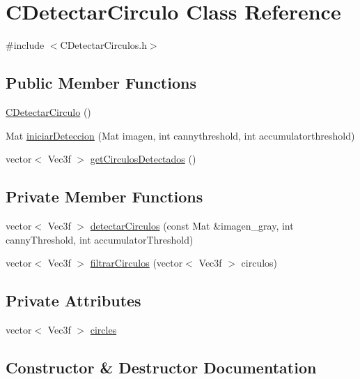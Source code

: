 \hypertarget{classCDetectarCirculo}{}\section{C\+Detectar\+Circulo Class Reference}
\label{classCDetectarCirculo}


{\ttfamily \#include $<$C\+Detectar\+Circulos.\+h$>$}

\subsection*{Public Member Functions}
\begin{DoxyCompactItemize}
\item 
\hyperlink{classCDetectarCirculo_a1afdf8a823810d47823414ebcb6850a9}{C\+Detectar\+Circulo} ()
\item 
Mat \hyperlink{classCDetectarCirculo_a649c9f3888f669032bd3811c902d0ef9}{iniciar\+Deteccion} (Mat imagen, int cannythreshold, int accumulatorthreshold)
\item 
vector$<$ Vec3f $>$ \hyperlink{classCDetectarCirculo_a6521238e2bf5be28294aa480ad0933ba}{get\+Circulos\+Detectados} ()
\end{DoxyCompactItemize}
\subsection*{Private Member Functions}
\begin{DoxyCompactItemize}
\item 
vector$<$ Vec3f $>$ \hyperlink{classCDetectarCirculo_ad6b02b2bc1fbb78ce6d1c1a5d51522f6}{detectar\+Circulos} (const Mat \&imagen\+\_\+gray, int canny\+Threshold, int accumulator\+Threshold)
\item 
vector$<$ Vec3f $>$ \hyperlink{classCDetectarCirculo_adc8cdab3f0446334d56e9ac08b304639}{filtrar\+Circulos} (vector$<$ Vec3f $>$ circulos)
\end{DoxyCompactItemize}
\subsection*{Private Attributes}
\begin{DoxyCompactItemize}
\item 
vector$<$ Vec3f $>$ \hyperlink{classCDetectarCirculo_afb2bd271bd772e489fe948caa80bb7b7}{circles}
\end{DoxyCompactItemize}


\subsection{Constructor \& Destructor Documentation}
